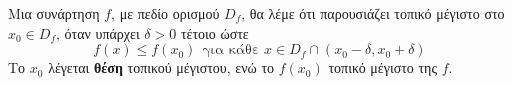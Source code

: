 Μια συνάρτηση $ f $, με πεδίο ορισμού $ D_f $, θα λέμε ότι παρουσιάζει τοπικό μέγιστο στο $ x_0\in D_f $, όταν υπάρχει $ \delta>0 $ τέτοιο ώστε
\[ f(x)\leq f(x_0)\ \ \textrm{για κάθε }x\in D_f\cap(x_0-\delta,x_0+\delta) \]
Το $ x_0 $ λέγεται \textbf{θέση} τοπικού μέγιστου, ενώ το $ f(x_0) $ τοπικό μέγιστο της $ f $.
